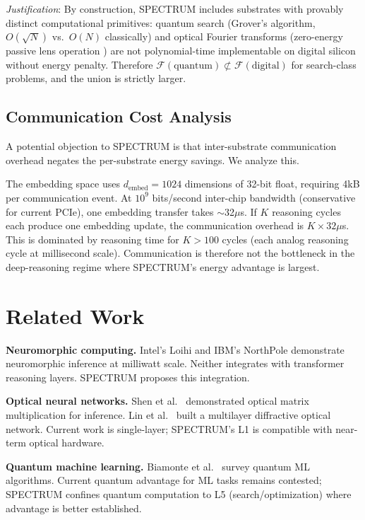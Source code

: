 \documentclass[12pt]{article}
\begin{document}
\textit{Justification}: By construction, SPECTRUM includes substrates with provably distinct computational primitives: quantum search (Grover's algorithm, $O(\sqrt{N})$ vs.\ $O(N)$ classically) and optical Fourier transforms (zero-energy passive lens operation \cite{goodman2005}) are not polynomial-time implementable on digital silicon without energy penalty. Therefore $\mathcal{F}(\text{quantum}) \not\subset \mathcal{F}(\text{digital})$ for search-class problems, and the union is strictly larger.

\subsection{Communication Cost Analysis}

A potential objection to SPECTRUM is that inter-substrate communication overhead negates the per-substrate energy savings. We analyze this.

The embedding space uses $d_{\text{embed}} = 1024$ dimensions of 32-bit float, requiring 4kB per communication event. At $10^9$ bits/second inter-chip bandwidth (conservative for current PCIe), one embedding transfer takes $\sim$32$\mu$s. If $K$ reasoning cycles each produce one embedding update, the communication overhead is $K \times 32\mu$s. This is dominated by reasoning time for $K > 100$ cycles (each analog reasoning cycle at millisecond scale). Communication is therefore not the bottleneck in the deep-reasoning regime where SPECTRUM's energy advantage is largest.

\section{Related Work}
\label{sec:related}

\textbf{Neuromorphic computing.} Intel's Loihi \cite{davies2021} and IBM's NorthPole \cite{ibm2023} demonstrate neuromorphic inference at milliwatt scale. Neither integrates with transformer reasoning layers. SPECTRUM proposes this integration.

\textbf{Optical neural networks.} Shen et al.\ \cite{shen2017} demonstrated optical matrix multiplication for inference. Lin et al.\ \cite{lin2018} built a multilayer diffractive optical network. Current work is single-layer; SPECTRUM's L1 is compatible with near-term optical hardware.

\textbf{Quantum machine learning.} Biamonte et al.\ \cite{biamonte2017} survey quantum ML algorithms. Current quantum advantage for ML tasks remains contested; SPECTRUM confines quantum computation to L5 (search/optimization) where advantage is better established.
\end{document}
